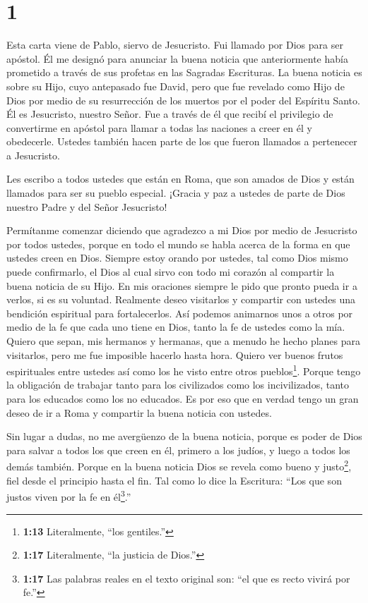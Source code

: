 \hypertarget{section}{%
\section{1}\label{section}}

 Esta carta viene de Pablo, siervo de Jesucristo. Fui
llamado por Dios para ser apóstol. Él me designó para anunciar la buena
noticia  que anteriormente había prometido a través de sus
profetas en las Sagradas Escrituras.  La buena noticia es
sobre su Hijo, cuyo antepasado fue David,  pero que fue
revelado como Hijo de Dios por medio de su resurrección de los muertos
por el poder del Espíritu Santo. Él es Jesucristo, nuestro Señor.
 Fue a través de él que recibí el privilegio de convertirme
en apóstol para llamar a todas las naciones a creer en él y obedecerle.
 Ustedes también hacen parte de los que fueron llamados a
pertenecer a Jesucristo.

 Les escribo a todos ustedes que están en Roma, que son
amados de Dios y están llamados para ser su pueblo especial. ¡Gracia y
paz a ustedes de parte de Dios nuestro Padre y del Señor Jesucristo!

 Permítanme comenzar diciendo que agradezco a mi Dios por
medio de Jesucristo por todos ustedes, porque en todo el mundo se habla
acerca de la forma en que ustedes creen en Dios.  Siempre
estoy orando por ustedes, tal como Dios mismo puede confirmarlo, el Dios
al cual sirvo con todo mi corazón al compartir la buena noticia de su
Hijo.  En mis oraciones siempre le pido que pronto pueda ir
a verlos, si es su voluntad.  Realmente deseo visitarlos y
compartir con ustedes una bendición espiritual para fortalecerlos.
 Así podemos animarnos unos a otros por medio de la fe que
cada uno tiene en Dios, tanto la fe de ustedes como la mía.
 Quiero que sepan, mis hermanos y hermanas, que a menudo he
hecho planes para visitarlos, pero me fue imposible hacerlo hasta hora.
Quiero ver buenos frutos espirituales entre ustedes así como los he
visto entre otros pueblos\footnote{\textbf{1:13} Literalmente, ``los
  gentiles.''}.  Porque tengo la obligación de trabajar
tanto para los civilizados como los incivilizados, tanto para los
educados como los no educados.  Es por eso que en verdad
tengo un gran deseo de ir a Roma y compartir la buena noticia con
ustedes.

 Sin lugar a dudas, no me avergüenzo de la buena noticia,
porque es poder de Dios para salvar a todos los que creen en él, primero
a los judíos, y luego a todos los demás también.  Porque en
la buena noticia Dios se revela como bueno y justo\footnote{\textbf{1:17}
  Literalmente, ``la justicia de Dios.''}, fiel desde el principio hasta
el fin. Tal como lo dice la Escritura: ``Los que son justos viven por la
fe en él\footnote{\textbf{1:17} Las palabras reales en el texto original
  son: ``el que es recto vivirá por fe.''}.''

